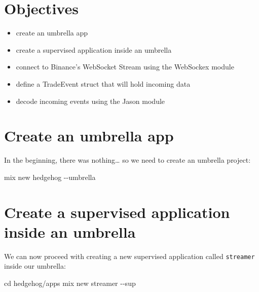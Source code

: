 \documentclass[
  oneside]{book}
\newenvironment{Shaded}{\begin{snugshade}}{\end{snugshade}}
\newcommand{\AttributeTok}[1]{\textcolor[rgb]{0.77,0.63,0.00}{#1}}
\newcommand{\BuiltInTok}[1]{#1}
\newcommand{\ExtensionTok}[1]{#1}
\newcommand{\NormalTok}[1]{#1}
\providecommand{\tightlist}{%
  \setlength{\itemsep}{0pt}\setlength{\parskip}{0pt}}
\begin{document}
\hypertarget{objectives}{%
\section{Objectives}\label{objectives}}

\begin{itemize}
\tightlist
\item
  create an umbrella app
\item
  create a supervised application inside an umbrella
\item
  connect to Binance's WebSocket Stream using the WebSockex module
\item
  define a TradeEvent struct that will hold incoming data
\item
  decode incoming events using the Jason module
\end{itemize}

\hypertarget{create-an-umbrella-app}{%
\section{Create an umbrella app}\label{create-an-umbrella-app}}

In the beginning, there was nothing\ldots{} so we need to create an umbrella project:

\begin{Shaded}
\begin{Highlighting}[]
\ExtensionTok{mix}\NormalTok{ new hedgehog }\AttributeTok{{-}{-}umbrella}
\end{Highlighting}
\end{Shaded}

\hypertarget{create-a-supervised-application-inside-an-umbrella}{%
\section{Create a supervised application inside an umbrella}\label{create-a-supervised-application-inside-an-umbrella}}

We can now proceed with creating a new supervised application called \texttt{streamer} inside our umbrella:

\begin{Shaded}
\begin{Highlighting}[]
\BuiltInTok{cd}\NormalTok{ hedgehog/apps}
\ExtensionTok{mix}\NormalTok{ new streamer }\AttributeTok{{-}{-}sup}
\end{Highlighting}
\end{Shaded}
\end{document}
